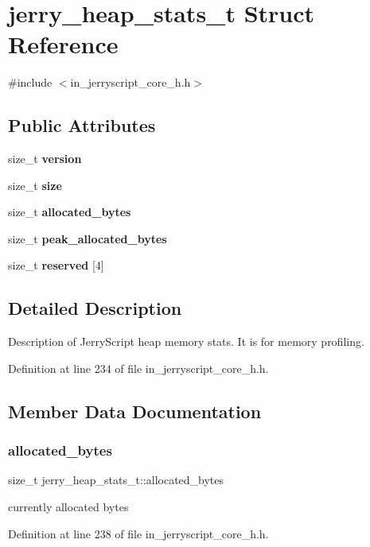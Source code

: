 \section{jerry\+\_\+heap\+\_\+stats\+\_\+t Struct Reference}
\label{structjerry__heap__stats__t}


{\ttfamily \#include $<$in\+\_\+jerryscript\+\_\+core\+\_\+h.\+h$>$}

\subsection*{Public Attributes}
\begin{DoxyCompactItemize}
\item 
size\+\_\+t \textbf{ version}
\item 
size\+\_\+t \textbf{ size}
\item 
size\+\_\+t \textbf{ allocated\+\_\+bytes}
\item 
size\+\_\+t \textbf{ peak\+\_\+allocated\+\_\+bytes}
\item 
size\+\_\+t \textbf{ reserved} [4]
\end{DoxyCompactItemize}


\subsection{Detailed Description}
Description of Jerry\+Script heap memory stats. It is for memory profiling. 

Definition at line 234 of file in\+\_\+jerryscript\+\_\+core\+\_\+h.\+h.



\subsection{Member Data Documentation}
\mbox{\label{structjerry__heap__stats__t_ac651c2d76b8cacf1b1b79690544ea36f}} 
\subsubsection{allocated\_bytes}
{\footnotesize\ttfamily size\+\_\+t jerry\+\_\+heap\+\_\+stats\+\_\+t\+::allocated\+\_\+bytes}

currently allocated bytes 

Definition at line 238 of file in\+\_\+jerryscript\+\_\+core\+\_\+h.\+h.


